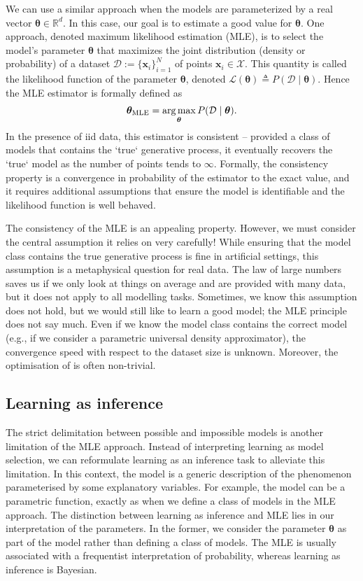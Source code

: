 We can use a similar approach when the models are parameterized by a real vector $\bm{\theta} \in \mathbb{R}^d$. In this case, our goal is to estimate a good value for $\bm{\theta}$. One approach, denoted maximum likelihood estimation (MLE), is to select the model's parameter $\bm{\theta}$ that maximizes the joint distribution (density or probability) of a dataset $\mathcal{D}:=\{\mathbf{x}_i\}_{i=1}^N$ of points $\bm{x}_i \in \mathcal{X}$. This quantity is called the likelihood function of the parameter $\bm{\theta}$, denoted $\mathcal{L}(\bm{\theta}) \triangleq P(\mathcal{D}\mid\bm{\theta})$. Hence the MLE estimator is formally defined as
\begin{align}
   \bm{\theta}_{\text{MLE}} = \operatorname*{arg\,max}_{\bm{\theta}} P(\mathcal{D}\mid\bm{\theta}). \label{eq:chap02:MLE}
\end{align}
In the presence of iid data, this estimator is consistent -- provided a class of models that contains the `true` generative process, it eventually recovers the `true` model as the number of points tends to $\infty$. Formally, the consistency property is a convergence in probability of the estimator to the exact value, and it requires additional assumptions that ensure the model is identifiable and the likelihood function is well behaved. %

The consistency of the MLE is an appealing property. However, we must consider the central assumption it relies on very carefully! While ensuring that the model class contains the true generative process is fine in artificial settings, this assumption is a metaphysical question for real data. The law of large numbers saves us if we only look at things on average and are provided with many data, but it does not apply to all modelling tasks. Sometimes, we know this assumption does not hold, but we would still like to learn a good model; the MLE principle does not say much. Even if we know the model class contains the correct model (e.g., if we consider a parametric universal density approximator), the convergence speed with respect to the dataset size is unknown. Moreover, the optimisation of  is often non-trivial.


\subsection{Learning as inference}
The strict delimitation between possible and impossible models is another limitation of the MLE approach. Instead of interpreting learning as model selection, we can reformulate learning as an inference task to alleviate this limitation. In this context, the model is a generic description of the phenomenon parameterised by some explanatory variables. For example, the model can be a parametric function, exactly as when we define a class of models in the MLE approach. The distinction between learning as inference and MLE lies in our interpretation of the parameters. In the former, we consider the parameter $\bm \theta$ as part of the model rather than defining a class of models. The MLE is usually associated with a frequentist interpretation of probability, whereas learning as inference is Bayesian.

